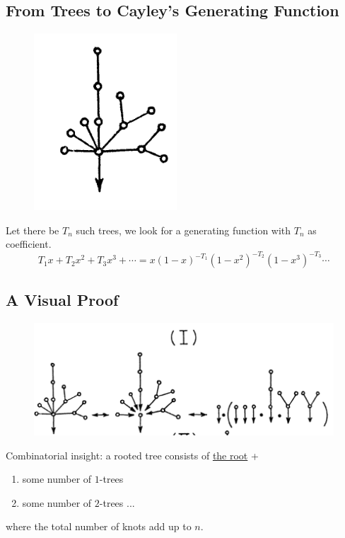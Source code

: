 \documentclass{article}
\theoremstyle{definition}
\theoremstyle{question}
\begin{document}
    \subsection{From Trees to Cayley’s Generating Function}
        \begin{figure}[h]
            \centering
            \includegraphics[scale=0.3]{images/rooted-tree.png}
            \label{fig:rooted-tree}
        \end{figure}
        \noindent Let there be $T_n$ such trees, we look for a generating function with 
        $T_n$ as coefficient.
        \begin{equation*} %
             T_1x + T_2 x^2 + T_3 x^3 +\cdots = x(1-x)^{-T_1}(1-x^2)^{-T_2}(1-x^3)^{-T_3}\cdots
        \end{equation*}

    \subsection{A Visual Proof}
        \begin{figure}[h]
            \centering
            \includegraphics[scale=0.6]{images/tree1.png}
            \label{fig:enter-label}
        \end{figure}
    Combinatorial insight: a rooted tree consists of \underline{the root} +  
    \begin{enumerate}
        \item some number of $1$-trees
        \item some number of $2$-trees ...
    \end{enumerate}
    where the total number of knots add up to $n$.
\end{document}
